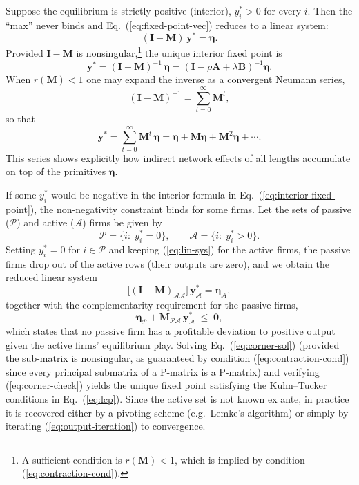 Suppose the equilibrium is strictly positive (interior), $y_i^{\ast}>0$ for every $i$. Then the ``max'' never binds and Eq.~(\ref{eq:fixed-point-vec}) reduces to a linear system:
\begin{equation}
(\mathbf{I}-\mathbf{M})\,\mathbf y^{\ast}=\boldsymbol{\eta}.
\label{eq:lin-sys}
\end{equation}
Provided $\mathbf{I}-\mathbf{M}$ is nonsingular,\footnote{A sufficient condition is $r(\mathbf{M})<1$, which is implied by condition (\ref{eq:contraction-cond}).} the unique interior fixed point is
\begin{equation}
\mathbf y^{\ast}=(\mathbf{I}-\mathbf{M})^{-1}\,\boldsymbol{\eta}
= (\mathbf{I}-\rho \mathbf{A}+\lambda \mathbf{B})^{-1}\boldsymbol{\eta}.
\label{eq:interior-fixed-point}
\end{equation}
When $r(\mathbf{M})<1$ one may expand the inverse as a convergent Neumann series,
\[
(\mathbf{I}-\mathbf{M})^{-1}=\sum_{t=0}^{\infty}\mathbf{M}^{t},
\]
so that
\[
\mathbf y^{\ast}
=\sum_{t=0}^{\infty}\mathbf{M}^{t}\,\boldsymbol{\eta}
=\boldsymbol{\eta}+\mathbf{M}\boldsymbol{\eta}+\mathbf{M}^{2}\boldsymbol{\eta}+\cdots.
\]
This series shows explicitly how indirect network effects of all lengths accumulate on top of the primitives $\boldsymbol{\eta}$.

If some $y_i^{\ast}$ would be negative in the interior formula in Eq.~(\ref{eq:interior-fixed-point}), the non-negativity constraint binds for some firms.
Let the sets of passive ($\mathcal P$) and active ($\mathcal A$) firms be given by
\begin{equation}
\mathcal P=\bigl\{i:\;y_i^{\ast}=0\bigr\},
\qquad
\mathcal A=\bigl\{i:\;y_i^{\ast}>0\bigr\}.
\end{equation}
Setting $y_i^{\ast}=0$ for $i\in\mathcal P$ and keeping (\ref{eq:lin-sys}) for the active firms, the passive firms drop out of the active rows (their outputs are zero), and we obtain the reduced linear system
\begin{equation}
\bigl[(\mathbf{I}-\mathbf{M})_{\mathcal A\mathcal A}\bigr]\,
\mathbf y^{\ast}_{\mathcal A}=\boldsymbol{\eta}_{\mathcal A},
\label{eq:corner-sol}
\end{equation}
together with the complementarity requirement for the passive firms,
\begin{equation}
\boldsymbol{\eta}_{\mathcal P}+\mathbf{M}_{\mathcal P\mathcal A}\,\mathbf y^{\ast}_{\mathcal A}\;\le\;\mathbf 0,
\label{eq:corner-check}
\end{equation}
which states that no passive firm has a profitable deviation to positive output given the active firms' equilibrium play. Solving Eq.~(\ref{eq:corner-sol}) (provided the sub-matrix is nonsingular, as guaranteed by condition (\ref{eq:contraction-cond}) since every principal submatrix of a P-matrix is a P-matrix) and verifying (\ref{eq:corner-check}) yields the unique fixed point satisfying the Kuhn--Tucker conditions in Eq.~(\ref{eq:lcp}). Since the active set is not known ex ante, in practice it is recovered either by a pivoting scheme (e.g.\ Lemke's algorithm) or simply by iterating (\ref{eq:output-iteration}) to convergence.

